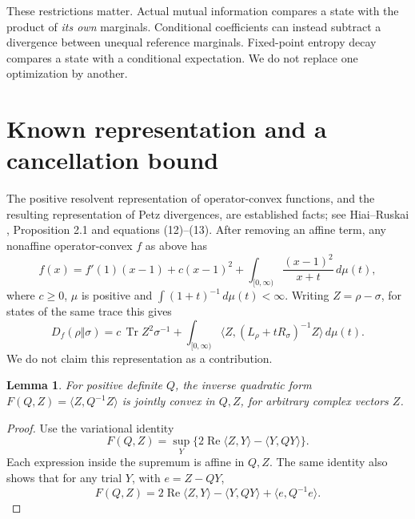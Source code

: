 \documentclass[11pt]{article}
\newcommand{\Tr}{\operatorname{Tr}}
\newcommand{\ip}[2]{\langle #1,#2\rangle}
\newtheorem{lemma}[theorem]{Lemma}
\theoremstyle{remark}
\begin{document}
These restrictions matter. Actual mutual information compares a state with the product of \emph{its own} marginals. Conditional coefficients can instead subtract a divergence between unequal reference marginals. Fixed-point entropy decay compares a state with a conditional expectation. We do not replace one optimization by another.


\section{Known representation and a cancellation bound}
The positive resolvent representation of operator-convex functions, and the resulting representation of Petz divergences, are established facts; see Hiai--Ruskai \cite{HR}, Proposition 2.1 and equations (12)--(13). After removing an affine term, any nonaffine operator-convex \(f\) as above has
\begin{equation}\label{eq:representation}
 f(x)=f'(1)(x-1)+c(x-1)^2+
 \int_{[0,\infty)}\frac{(x-1)^2}{x+t}\,d\mu(t),
\end{equation}
where \(c\ge0\), \(\mu\) is positive and
\(\int(1+t)^{-1}\,d\mu(t)<\infty\).
Writing \(Z=\rho-\sigma\), for states of the same trace this gives
\begin{equation}\label{eq:resolvent}
 D_f(\rho\Vert\sigma)=
 c\,\Tr Z^2\sigma^{-1}+
 \int_{[0,\infty)}
 \ip{Z}{(L_\rho+tR_\sigma)^{-1}Z}\,d\mu(t).
\end{equation}
We do not claim this representation as a contribution.

\begin{lemma}\label{lem:inverse}
For positive definite \(Q\), the inverse quadratic form
\(F(Q,Z)=\ip{Z}{Q^{-1}Z}\) is jointly convex in \(Q,Z\), for arbitrary complex vectors \(Z\).
\end{lemma}
\begin{proof}
Use the variational identity
\[
 F(Q,Z)=\sup_Y\{2\operatorname{Re}\ip{Z}{Y}-\ip{Y}{QY}\}.
\]
Each expression inside the supremum is affine in \(Q,Z\).
The same identity also shows that for any trial \(Y\), with \(e=Z-QY\),
\begin{equation}\label{eq:residual}
 F(Q,Z)=2\operatorname{Re}\ip{Z}{Y}-\ip{Y}{QY}
       +\ip{e}{Q^{-1}e}.
\end{equation}
\end{proof}
\end{document}
